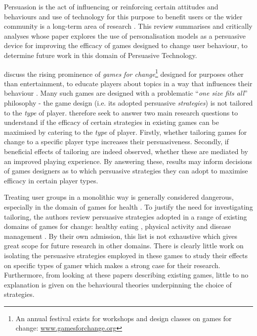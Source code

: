 \documentclass[11pt]{article}
\begin{document}

Persuasion is the act of influencing or reinforcing certain attitudes and behaviours \citep{khaled2008} and use of technology for this purpose to benefit users or the wider community is a long-term area of research \citep{fogg2002}. This review summarises and critically analyses \citet{orji2017} whose paper explores the use of personalisation models as a persuasive device for improving the efficacy of games designed to change user behaviour, to determine future work in this domain of Persuasive Technology.

\citet{orji2017} discuss the rising prominence of \textit{games for change}\footnote{An annual festival exists for workshops and design classes on games for change: \url{www.gamesforchange.org}} designed for purposes other than entertainment, to educate players about topics in a way that influences their behaviour \citep{busch2015}. Many such games are designed with a problematic ``\textit{one size fits all}'' philosophy - the game design (i.e. its adopted persuasive \textit{strategies}) is not tailored to the \textit{type} of player. \citet{orji2017} therefore seek to answer two main research questions to understand if the efficacy of certain strategies in existing games \citep{peng2009,kaipainen2012} can be maximised by catering to the \textit{type} of player. Firstly, whether tailoring games for change to a specific player type increases their persuasiveness. Secondly, if beneficial effects of tailoring are indeed observed, whether these are mediated by an improved playing experience. By answering these, results may inform decisions of games designers as to which persuasive strategies they can adopt to maximise efficacy in certain player types. 

Treating user groups in a monolithic way is generally considered dangerous, especially in the domain of games for health \citep{berkovsky2010}.  To justify the need for investigating tailoring, the authors review persuasive strategies adopted in a range of existing domains of games for change: healthy eating \citep{kaipainen2012, orji2013b}, physical activity \citep{fujiki2008} and disease management \citep{brownson2007}. By their own admission, this list is not exhaustive which gives great scope for future research in other domains. There is clearly little work on isolating the persuasive strategies employed in these games to study their effects on specific types of gamer which makes a strong case for their research. Furthermore, from looking at these papers describing existing games, little to no explanation is given on the behavioural theories underpinning the choice of strategies. 
\end{document}
